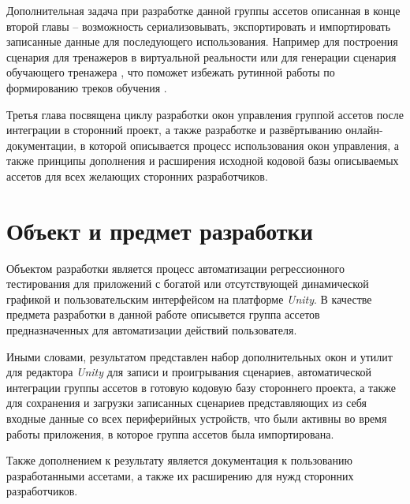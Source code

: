 Дополнительная задача при разработке данной группы ассетов описанная в конце второй главы -- возможность сериализовывать, экспортировать и импортировать записанные данные для последующего использования. Например для построения сценария для тренажеров в виртуальной реальности \cite{disser} или для генерации сценария обучающего тренажера \cite{vr-simulators}, что поможет избежать рутинной работы по формированию треков обучения \cite{visual-editor}.

Третья глава посвящена циклу разработки окон управления группой ассетов после интеграции в сторонний проект, а также разработке и развёртыванию онлайн-документации, в которой описывается процесс использования окон управления, а также принципы дополнения и расширения исходной кодовой базы описываемых ассетов для всех желающих сторонних разработчиков.


\section*{Объект и предмет разработки}
Объектом разработки является процесс автоматизации регрессионного тестирования для приложений с богатой или отсутствующей динамической графикой и пользовательским интерфейсом на платформе \textit{Unity}. В качестве предмета разработки в данной работе описывется группа ассетов предназначенных для автоматизации действий пользователя.

Иными словами, результатом представлен набор дополнительных окон и утилит для редактора \textit{Unity} для записи и проигрывания сценариев, автоматической интеграции группы ассетов в готовую кодовую базу стороннего проекта, а также для сохранения и загрузки записанных сценариев представляющих из себя входные данные со всех периферийных устройств, что были активны во время работы приложения, в которое группа ассетов была импортирована. 

Также дополнением к результату является документация к пользованию разработанными ассетами, а также их расширению для нужд сторонних разработчиков.
